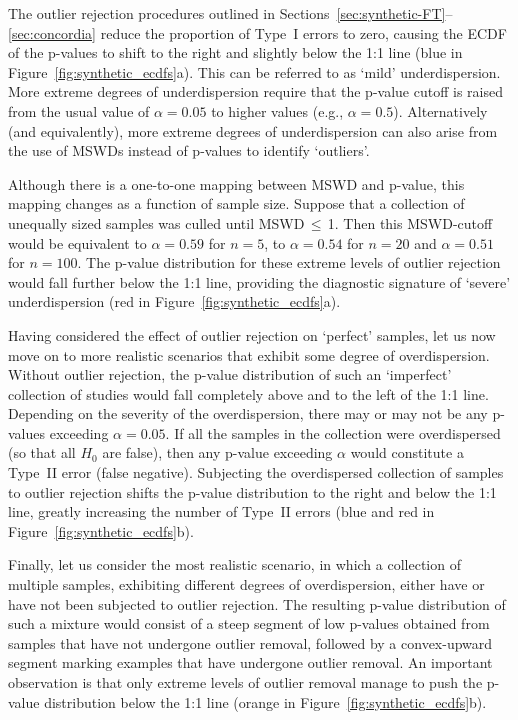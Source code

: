 \documentclass{article}
\begin{document}
The outlier rejection procedures outlined in
Sections~\ref{sec:synthetic-FT}--\ref{sec:concordia} reduce the
proportion of Type~I errors to zero, causing the ECDF of the p-values
to shift to the right and slightly below the 1:1 line (blue
in Figure~\ref{fig:synthetic_ecdfs}a). This can be referred to as
`mild' underdispersion. More extreme degrees of underdispersion
require that the p-value cutoff is raised from the usual value of
$\alpha = 0.05$ to higher values (e.g., $\alpha=0.5$). Alternatively
(and equivalently), more extreme degrees of underdispersion can also
arise from the use of MSWDs instead of p-values to identify
`outliers'.\medskip

Although there is a one-to-one mapping between MSWD and p-value, this
mapping changes as a function of sample size. Suppose that a
collection of unequally sized samples was culled until
MSWD\,$\leq$\,1. Then this MSWD-cutoff would be equivalent to
$\alpha=0.59$ for $n=5$, to $\alpha=0.54$ for $n=20$ and $\alpha=0.51$
for $n=100$. The p-value distribution for these extreme levels of
outlier rejection would fall further below the 1:1 line, providing the
diagnostic signature of `severe' underdispersion
(red in Figure~\ref{fig:synthetic_ecdfs}a).\medskip

Having considered the effect of outlier rejection on `perfect'
samples, let us now move on to more realistic scenarios that exhibit
some degree of overdispersion. Without outlier rejection, the p-value
distribution of such an `imperfect' collection of studies would fall
completely above and to the left of the 1:1 line. Depending on the
severity of the overdispersion, there may or may not be any p-values
exceeding $\alpha=0.05$. If all the samples in the collection were
overdispersed (so that all $H_0$ are false), then any p-value
exceeding $\alpha$ would constitute a Type~II error (false
negative). Subjecting the overdispersed collection of samples to
outlier rejection shifts the p-value distribution to the right and
below the 1:1 line, greatly increasing the number of Type~II errors
(blue and red in Figure~\ref{fig:synthetic_ecdfs}b).\medskip

Finally, let us consider the most realistic scenario, in which a
collection of multiple samples, exhibiting different degrees of
overdispersion, either have or have not been subjected to outlier
rejection. The resulting p-value distribution of such a mixture would
consist of a steep segment of low p-values obtained from samples that
have not undergone outlier removal, followed by a convex-upward
segment marking examples that have undergone outlier removal.  An
important observation is that only extreme levels of outlier removal
manage to push the p-value distribution below the 1:1 line
(orange in Figure~\ref{fig:synthetic_ecdfs}b).
\end{document}
